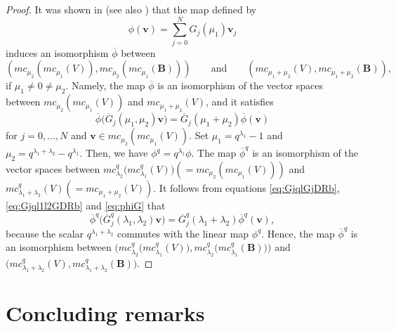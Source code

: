 \documentclass[pdftex]{sigma}
\numberwithin{equation}{section}
\theoremstyle{definition}
\begin{document}
\begin{proof}
It was shown in \cite{DR1} (see also \cite[Section~7.5]{Har}) that the map  defined by
\begin{equation*}
\phi (\mathbf{v}) = \sum _{j=0}^N G_j (\mu _1) \mathbf{v}_{j} %
\end{equation*}
induces an isomorphism $\overline{\phi } $ between
\[
(mc _{\mu _2} (mc _{\mu _1} (V)), mc _{\mu _2} (mc _{\mu _1} (\boldsymbol{B} )))\qquad \text{and} \qquad (mc _{\mu _1 +\mu _2} (V), mc _{\mu _1 +\mu _2} (\boldsymbol{B} )),
\]
 if $\mu _1\! \neq \! 0 \! \neq \! \mu _2$.
Namely, the map $\overline{\phi } $ is an isomorphism of the vector spaces between $ mc _{\mu _2} (mc _{\mu _1} (V))$ and $mc _{\mu _1 +\mu _2} (V) $, and it satisfies
\begin{equation}
\overline{\phi } \bigl( \overline{G}_j (\mu _1 , \mu _2 ) \mathbf{v}\bigr) = \overline{G}_j (\mu _1 + \mu _2 ) \overline{\phi } ( \mathbf{v}) \label{eq:phiG}
\end{equation}
for $j=0,\dots ,N$ and $ \mathbf{v} \in mc _{\mu _2} (mc _{\mu _1} (V))$.
Set $\mu _1 = q^{\lambda _1} -1$ and $ \mu _2 = q^{\lambda _1 + \lambda _2} - q^{\lambda _1 }$.
Then, we have $\phi ^{q} = q^{\lambda _1} \phi $.
The map $\overline{\phi } ^{q} $ is an isomorphism of the vector spaces between $ mc _{\lambda _2} ^{q} \bigl(mc _{\lambda _1} ^{q} (V)\bigr) (= mc _{\mu _2} (mc _{\mu _1} (V)))$ and $mc _{\lambda _1 +\lambda _2} ^{q} (V) (= mc _{\mu _1 +\mu _2} (V)) $.
It follows from equations \eqref{eq:GjqlGjDRb}, \eqref{eq:Gjql1l2GDRb} and \eqref{eq:phiG} that
\begin{equation*}
\overline{\phi } ^{q} \bigl( \overline{G}_j^{q} (\lambda _1 , \lambda _2 ) \mathbf{v}\bigr) = \overline{G}_j^{q} (\lambda _1 + \lambda _2 ) \overline{\phi } ^{q} ( \mathbf{v}) ,
\end{equation*}
because the scalar $q^{\lambda _1 +\lambda _2}$ commutes with the linear map $\phi ^{q} $.
Hence, the map $\overline{\phi }^{q} $ is an isomorphism between $\bigl(mc _{\lambda _2} ^{q} \bigl(mc _{\lambda _1} ^{q} (V)\bigr), mc _{\lambda _2} ^{q} \bigl(mc _{\lambda _1} ^{q} (\boldsymbol{B} )\bigr)\bigr)$ and $\bigl(mc _{\lambda _1 +\lambda _2} ^{q} (V), mc _{\lambda _1 +\lambda _2} ^{q} (\boldsymbol{B} )\bigr)$.
\end{proof}

\section{Concluding remarks} \label{sec:rmk}
\end{document}
